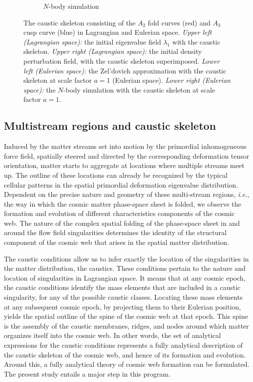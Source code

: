 \documentclass[a4paper, 11pt]{article}
\begin{document}
\begin{figure}
\begin{subfigure}[b]{0.49\textwidth}
\caption{$N$-body simulation}
\end{subfigure}
\caption{The caustic skeleton consisting of the $A_2$ fold curves (red) and $A_3$ cusp curve (blue) in Lagrangian and Eulerian space. \textit{Upper left (Lagrangian space):} the initial eigenvalue field $\lambda_1$ with the caustic skeleton. \textit{Upper right (Lagrangian space):} the initial density perturbation field, with the caustic skeleton superimposed. \textit{Lower left (Eulerian space):} the Zel'dovich approximation with the caustic skeleton at scale factor $a=1$ (Eulerian space). \textit{Lower right (Eulerian space):}  the $N$-body simulation with the caustic skeleton at scale factor $a=1$.}
\label{fig:Eulerian}
\end{figure}

\subsection{Multistream regions and caustic skeleton}
Induced by the matter streams set into motion by the primordial inhomogeneous force field, spatially steered and directed by the corresponding deformation tensor orientation, matter starts to aggregate at locations where multiple streams meet up. The outline of these locations can already be recognized by the typical cellular patterns in the spatial primordial deformation eigenvalue distribution. Dependent on the precise nature and geometry of these multi-stream regions, \textit{i.e.}, the way in which the cosmic matter phase-space sheet is folded, we observe the formation and evolution of different characteristics components of the cosmic web. The nature of the complex spatial folding of the phase-space sheet in and around the flow field singularities determines the identity of the structural component of the cosmic web that arises in the spatial matter distribution.

The caustic conditions \cite{Feldbrugge:2018} allow us to infer exactly the location of the singularities in the matter distribution, the caustics. These conditions pertain to the nature and location of singularities in Lagrangian space. It means that at any cosmic epoch, the caustic conditions identify the mass elements that are included in a caustic singularity, for any of the possible caustic classes. Locating these mass elements at any subsequent cosmic epoch, by projecting them to their Eulerian position, yields the spatial outline of the spine of the cosmic web at that epoch. This spine is the assembly of the caustic membranes, ridges, and nodes around which matter organizes itself into the cosmic web. In other words, the set of analytical expressions for the caustic conditions represents a fully analytical description of the caustic skeleton of the cosmic web, and hence of its formation and evolution. Around this, a fully analytical theory of cosmic web formation can be formulated. The present study entails a major step in this program. 
\end{document}
